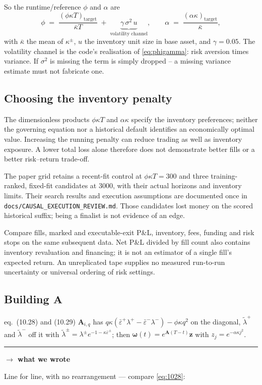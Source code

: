 \documentclass[11pt,a4paper]{article}
\newcommand{\wecode}{\par\vspace{4pt}\noindent
  \textcolor{NavyLink}{\rule{\linewidth}{0.4pt}}\par\vspace{3pt}
  \noindent\textbf{\textcolor{NavyLink}{$\rightarrow$ what we wrote}}\par\vspace{2pt}}
\newcommand{\epsb}{\bar{\varepsilon}}
\begin{document}
So the runtime/reference $\phi$ and $\alpha$ are
\[
  \phi \;=\; \frac{(\phi\kappa T)_{\text{target}}}{\bar{\kappa}T}
             \;+\; \underbrace{\gamma\,\sigma^{2}\,u}_{\text{volatility channel}},
  \qquad
  \alpha \;=\; \frac{(\alpha\kappa)_{\text{target}}}{\bar{\kappa}},
\]
with $\bar\kappa$ the mean of $\kappa^\pm$, $u$ the inventory unit size in base
asset, and $\gamma = 0.05$. The volatility channel is the code's realisation of
\eqref{eq:phigamma}: risk aversion times variance. If $\sigma^2$ is missing the
term is simply dropped -- a missing variance estimate must not fabricate one.

\subsection{Choosing the inventory penalty}
\label{sec:phisweep}

The dimensionless products $\phi\kappa T$ and $\alpha\kappa$ specify the
inventory preferences; neither the governing equation nor a historical default
identifies an economically optimal value. Increasing the running penalty can
reduce trading as well as inventory exposure. A lower total loss alone therefore
does not demonstrate better fills or a better risk--return trade-off.

The paper grid retains a recent-fit control at $\phi\kappa T=300$ and three
training-ranked, fixed-fit candidates at $3000$, with their actual horizons and
inventory limits. Their search results and execution assumptions are documented
once in \nolinkurl{docs/CAUSAL_EXECUTION_REVIEW.md}. Those candidates lost money
on the scored historical suffix; being a finalist is not evidence of an edge.

Compare fills, marked and executable-exit P\&L, inventory, fees, funding and
risk stops on the same subsequent data. Net P\&L divided by fill count also
contains inventory revaluation and financing; it is not an estimator of a
single fill's expected return. An unreplicated tape supplies no measured
run-to-run uncertainty or universal ordering of risk settings.

\subsection{Building \texorpdfstring{$\mathbf{A}$}{A}}

\begin{booktocode}{eq.~(10.28) and (10.29)}
$\mathbf{A}_{i,q}$ has $q\kappa(\epsb^{+}\lambda^{+}-\epsb^{-}
\lambda^{-}) - \phi\kappa q^{2}$ on the diagonal, $\tilde{\lambda}^{+}$ and
$\tilde{\lambda}^{-}$ off it with $\tilde{\lambda}^{\pm} = \lambda^{\pm}
e^{-1-\kappa\epsb^{\pm}}$; then $\boldsymbol{\omega}(t) = e^{\mathbf{A}(T-t)}
\mathbf{z}$ with $z_j = e^{-\alpha\kappa j^{2}}$.
\wecode
Line for line, with no rearrangement --- compare \eqref{eq:1028}:
\end{booktocode}
\end{document}
